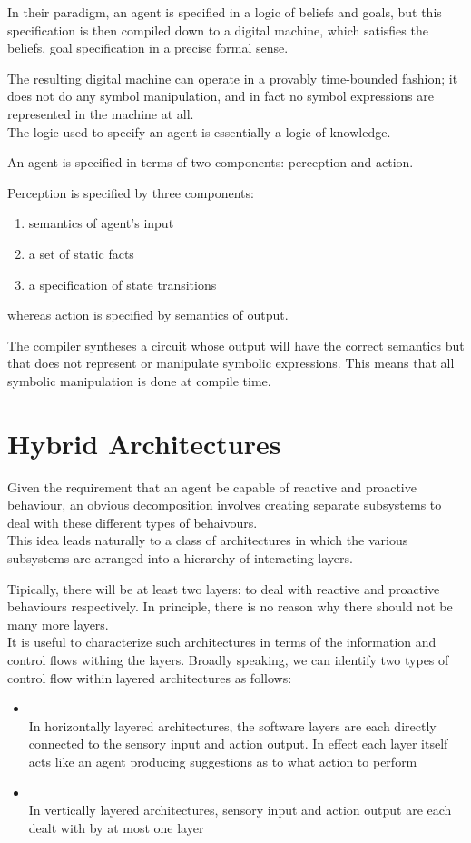In their  paradigm, an agent is specified in a logic of beliefs and goals, but this specification is then compiled down to a digital machine, which satisfies the beliefs, goal specification in a precise formal sense.

The resulting digital machine can operate in a provably time-bounded fashion; it does not do any symbol manipulation, and in fact no symbol expressions are represented in the machine at all.\\
The logic used to specify an agent is essentially a logic of knowledge.

An agent is specified in terms of two components: perception and action.

Perception is specified by three components:
\begin{enumerate}
\item semantics of agent's input
\item a set of static facts
\item a specification of state transitions
\end{enumerate}
whereas action is specified by semantics of output.

The compiler syntheses a circuit whose output will have the correct semantics but that does not represent or manipulate symbolic expressions. This means that all symbolic manipulation is done at compile time.

\section{Hybrid Architectures}
Given the requirement that an agent be capable of reactive and proactive behaviour, an obvious decomposition involves creating separate subsystems to deal with these different types of behaivours.\\
This idea leads naturally to a class of architectures in which the various subsystems are arranged into a hierarchy of interacting layers.

Tipically, there will be at least two layers: to deal with reactive and proactive behaviours respectively. In principle, there is no reason why there should not be many more layers.\\
It is useful to characterize such architectures in terms of the information and control flows withing the layers. Broadly speaking, we can identify two types of control flow within layered architectures as follows:
\begin{itemize}
\item {}\\
In horizontally layered architectures, the software layers are each directly connected to the sensory input and action output. In effect each layer itself acts like an agent producing suggestions as to what action to perform
\item {}\\
In vertically layered architectures, sensory input and action output are each dealt with by at most one layer
\end{itemize}

